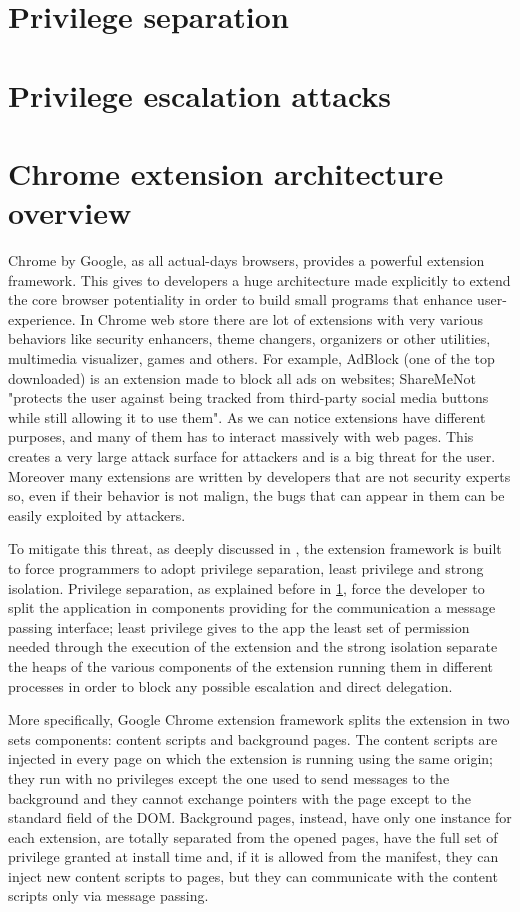 \section{Privilege separation}
\label{sec:PriviSep}

\section{Privilege escalation attacks}
\label{sec:Escalation}

\section{Chrome extension architecture overview}
\label{sec:ExtOverview}
Chrome by Google, as all actual-days browsers, provides a powerful extension framework. This gives to developers a huge architecture made explicitly to extend the core browser potentiality in order to build small programs that enhance user-experience. In Chrome web store there are lot of extensions with very various behaviors like security enhancers, theme changers, organizers or other utilities, multimedia visualizer, games and others. For example, AdBlock (one of the top downloaded) is an extension made to block all ads on websites; ShareMeNot "protects the user against being tracked from third-party social media buttons while still allowing it to use them"\cite{ShareMeNot}. As we can notice extensions have different purposes, and many of them has to interact massively with web pages. This creates a very large attack surface for attackers and is a big threat for the user. Moreover many extensions are written by developers that are not security experts so, even if their behavior is not malign, the bugs that can appear in them can be easily exploited by attackers.

To mitigate this threat, as deeply discussed in \cite{ChromeExtSpec}, the extension framework is built to force programmers to adopt privilege separation, least privilege and strong isolation. Privilege separation, as explained before in \ref{sec:PriviSep}, force the developer to split the application in components providing for the communication a message passing interface; least privilege gives to the app the least set of permission needed through the execution of the extension and the strong isolation separate the heaps of the various components of the extension running them in different processes in order to block any possible escalation and direct delegation.

More specifically, Google Chrome extension framework \cite{ChromeExtensionOnline} splits the extension in two sets components: content scripts and background pages. The content scripts are injected in every page on which the extension is running using the same origin; they run with no privileges except the one used to send messages to the background and they cannot exchange pointers with the page except to the standard field of the DOM. Background pages, instead, have only one instance for each extension, are totally separated from the opened pages, have the full set of privilege granted at install time and, if it is allowed from the manifest, they can inject new content scripts to pages, but they can communicate with the content scripts only via message passing.

